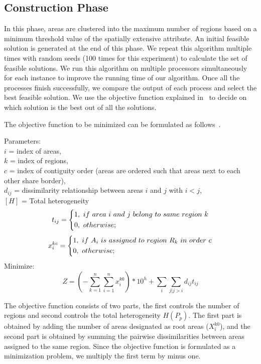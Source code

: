 \documentclass[conference]{IEEEtran}
\begin{document}
\subsection{Construction Phase}
In this phase, areas are clustered into the maximum number of regions based on
a minimum threshold value of the spatially extensive attribute. An initial feasible
solution is generated at the end of this phase. We repeat this algorithm
multiple times with random seeds (100 times for this experiment) to calculate the set of feasible
solutions. We run this algorithm on multiple processors simultaneously for each
instance to improve the running time of our algorithm. Once all the processes
finish successfully, we compare the output of each process and select the best
feasible solution. We use the objective function explained in~\cite{r1} to
decide on which solution is the best out of all the solutions.

The objective function to be minimized  can be formulated as follows~\cite{r1}.

Parameters:\\
$i$ = index of areas,\\
$k$ = index of regions,\\
$c$ = index of contiguity order (areas are ordered such that areas next to each other share border),\\
$d_{ij}$ = dissimilarity relationship between areas $i$ and $j$ with $i < j$,\\
$[H]$ = Total heterogeneity\\
\begin{equation*}[H]
t_{ij} = \begin{dcases*}
        1,\ if\ area\ i\ and\ j\ belong\ to\ same\ region\ k\\
        0,\ otherwise;
        \end{dcases*}
\end{equation*}
\begin{equation*}[H]
x_i^{kc} = \begin{dcases*}
        1,\ if\ A_i\ is\ assigned\ to\ region\ R_k\ in\ order\ c\\
        0,\ otherwise;
        \end{dcases*}
\end{equation*}
Minimize:
\begin{equation*}[H]
Z = (-\sum_{k=1}^n \sum_{i=1}^n x_i^{k0}) *10^h + \sum_{i} \sum_{j|j>i} d_{ij} t_{ij}
\end{equation*}

The objective function consists of two parts, the first controls the number of
regions and second controls the total heterogeneity $H(P_p)$. The first
part is obtained by adding the number of areas designated as root areas
($X_i^{k0}$), and the second part is obtained by summing the pairwise
dissimilarities between areas assigned to the same region. Since the objective
function is formulated as a minimization problem, we multiply the first term by
minus one.
\end{document}
